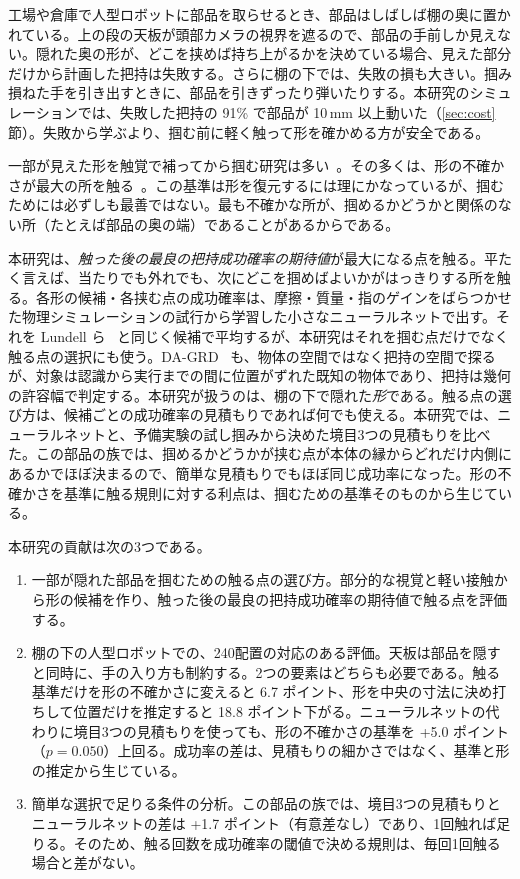 \documentclass[conference]{IEEEtran}
\begin{document}
工場や倉庫で人型ロボットに部品を取らせるとき、部品はしばしば棚の奥に置かれている。上の段の天板が頭部カメラの視界を遮るので、部品の手前しか見えない。隠れた奥の形が、どこを挟めば持ち上がるかを決めている場合、見えた部分だけから計画した把持は失敗する。さらに棚の下では、失敗の損も大きい。掴み損ねた手を引き出すときに、部品を引きずったり弾いたりする。本研究のシミュレーションでは、失敗した把持の 91\% で部品が 10\,mm 以上動いた（\ref{sec:cost} 節）。失敗から学ぶより、掴む前に軽く触って形を確かめる方が安全である。

一部が見えた形を触覚で補ってから掴む研究は多い~\cite{rustler2022actvh,rustler2023efficient,defarias2021simultaneous,rustler2026shapegrasp}。その多くは、形の不確かさが最大の所を触る~\cite{rustler2022actvh,dragiev2013uncertainty,kissoum2023tactile}。この基準は形を復元するには理にかなっているが、掴むためには必ずしも最善ではない。最も不確かな所が、掴めるかどうかと関係のない所（たとえば部品の奥の端）であることがあるからである。

本研究は、\emph{触った後の最良の把持成功確率の期待値}が最大になる点を触る。平たく言えば、当たりでも外れでも、次にどこを掴めばよいかがはっきりする所を触る。各形の候補・各挟む点の成功確率は、摩擦・質量・指のゲインをばらつかせた物理シミュレーションの試行から学習した小さなニューラルネットで出す。それを Lundell ら~\cite{lundell2019robust} と同じく候補で平均するが、本研究はそれを掴む点だけでなく触る点の選択にも使う。DA-GRD~\cite{wang2026dagrd} も、物体の空間ではなく把持の空間で探るが、対象は認識から実行までの間に位置がずれた既知の物体であり、把持は幾何の許容幅で判定する。本研究が扱うのは、棚の下で隠れた\emph{形}である。触る点の選び方は、候補ごとの成功確率の見積もりであれば何でも使える。本研究では、ニューラルネットと、予備実験の試し掴みから決めた境目3つの見積もりを比べた。この部品の族では、掴めるかどうかが挟む点が本体の縁からどれだけ内側にあるかでほぼ決まるので、簡単な見積もりでもほぼ同じ成功率になった。形の不確かさを基準に触る規則に対する利点は、掴むための基準そのものから生じている。

本研究の貢献は次の3つである。
\begin{enumerate}
\item 一部が隠れた部品を掴むための触る点の選び方。部分的な視覚と軽い接触から形の候補を作り、触った後の最良の把持成功確率の期待値で触る点を評価する。
\item 棚の下の人型ロボットでの、240配置の対応のある評価。天板は部品を隠すと同時に、手の入り方も制約する。2つの要素はどちらも必要である。触る基準だけを形の不確かさに変えると 6.7 ポイント、形を中央の寸法に決め打ちして位置だけを推定すると 18.8 ポイント下がる。ニューラルネットの代わりに境目3つの見積もりを使っても、形の不確かさの基準を +5.0 ポイント（$p=0.050$）上回る。成功率の差は、見積もりの細かさではなく、基準と形の推定から生じている。
\item 簡単な選択で足りる条件の分析。この部品の族では、境目3つの見積もりとニューラルネットの差は +1.7 ポイント（有意差なし）であり、1回触れば足りる。そのため、触る回数を成功確率の閾値で決める規則は、毎回1回触る場合と差がない。
\end{enumerate}
\end{document}
